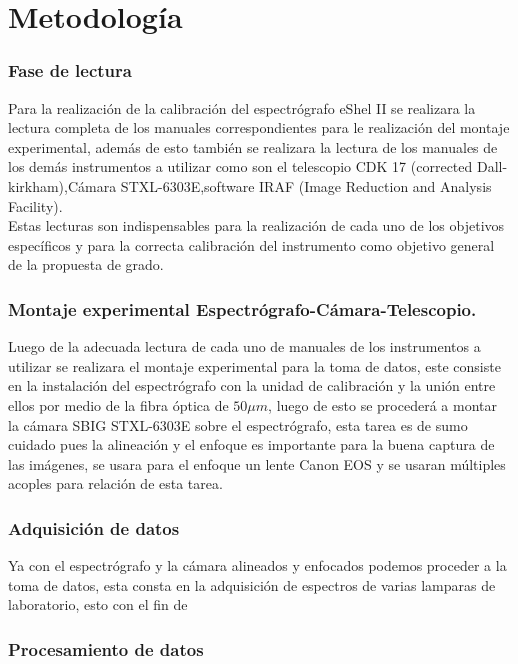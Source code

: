 
\newpage
\chapter{Metodología}


\subsection{Fase de lectura}
\noindent Para la realización de la calibración del espectrógrafo eShel II se realizara la lectura completa de los manuales correspondientes para le realización del montaje experimental, además de esto también se realizara la lectura de los manuales de los demás instrumentos a utilizar como son el telescopio CDK 17 (corrected Dall-kirkham),Cámara STXL-6303E,software IRAF (Image Reduction and Analysis Facility).\\
Estas lecturas son indispensables para la realización de cada uno de los objetivos específicos y para la correcta calibración del instrumento como objetivo general de la propuesta de grado.

\subsection{Montaje experimental  Espectrógrafo-Cámara-Telescopio.}
\noindent Luego de la adecuada lectura de cada uno de manuales de los instrumentos a utilizar se realizara el montaje experimental para la toma de datos, este consiste en la instalación del espectrógrafo con la unidad de calibración y la unión entre ellos por medio de la fibra óptica de $50 \mu m$, luego de esto se procederá a montar la cámara  SBIG STXL-6303E sobre el espectrógrafo, esta tarea es de sumo cuidado pues la alineación y el enfoque es importante para la buena captura de las imágenes, se usara para el enfoque un lente Canon EOS y se usaran múltiples acoples para relación de esta tarea.

\subsection{Adquisición de datos}
\noindent Ya con el espectrógrafo y la cámara alineados y enfocados podemos proceder a la toma de datos, esta consta en la adquisición de espectros de varias lamparas de laboratorio, esto con el fin de 

\subsection{Procesamiento de datos}

